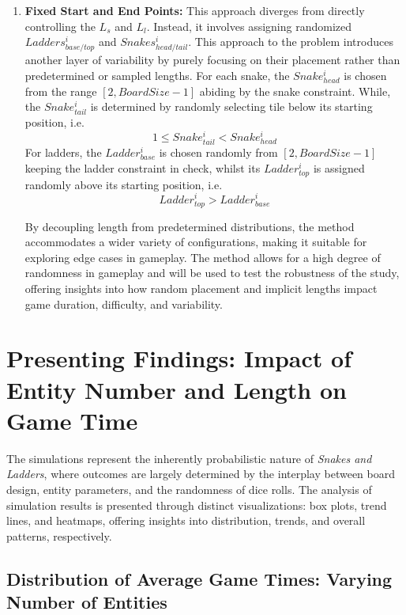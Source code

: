 \documentclass[12pt]{report}
\begin{document}
\begin{enumerate}
		\item \textbf{Fixed Start and End Points:} This approach diverges from directly controlling the $L_s$ and $L_l$. Instead, it involves assigning randomized $Ladders^i_{base/top}$ and $Snakes^i_{head/tail}$. This approach to the problem introduces another layer of variability by purely focusing on their placement rather than predetermined or sampled lengths.
		For each snake, the $Snake^i_{head}$ is chosen from the range $[2, BoardSize - 1]$ abiding by the snake constraint. While, the $Snake^i_{tail}$ is determined by randomly selecting tile below its starting position, i.e. $$1\leq Snake^i_{tail} < Snake^i_{head}$$ 
		For ladders, the $Ladder^i_{base}$ is chosen randomly from $[2, BoardSize - 1]$ keeping the ladder constraint in check, whilst its $Ladder^i_{top}$ is assigned randomly above its starting position, i.e. $$Ladder^i_{top}>Ladder^i_{base}$$ 
		
		By decoupling length from predetermined distributions, the method accommodates a wider variety of configurations, making it suitable for exploring edge cases in gameplay. The method allows for a high degree of randomness in gameplay and will be used to test the robustness of the study, offering insights into how random placement and implicit lengths impact game duration, difficulty, and variability.
	\end{enumerate}
	
	
	\section{Presenting Findings: Impact of Entity Number and Length on Game Time}
	
	The simulations represent the inherently probabilistic nature of \textit{Snakes and Ladders}, where outcomes are largely determined by the interplay between board design, entity parameters, and the randomness of dice rolls. The analysis of simulation results is presented through distinct visualizations: box plots, trend lines, and heatmaps, offering insights into distribution, trends, and overall patterns, respectively.
	
	\subsection{Distribution of Average Game Times: Varying Number of Entities}
	
\end{document}
